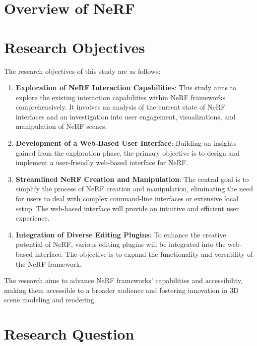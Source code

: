 \section{Overview of NeRF}
\label{sec:intro:nerf}


\section{Research Objectives}
\label{sec:intro:objectives}

The research objectives of this study are as follows:

\begin{enumerate}
    \item \textbf{Exploration of NeRF Interaction Capabilities}: This study aims to explore the existing interaction capabilities within NeRF frameworks comprehensively. It involves an analysis of the current state of NeRF interfaces and an investigation into user engagement, visualizations, and manipulation of NeRF scenes.

    \item \textbf{Development of a Web-Based User Interface}: Building on insights gained from the exploration phase, the primary objective is to design and implement a user-friendly web-based interface for NeRF.

    \item \textbf{Streamlined NeRF Creation and Manipulation}: The central goal is to simplify the process of NeRF creation and manipulation, eliminating the need for users to deal with complex command-line interfaces or extensive local setup. The web-based interface will provide an intuitive and efficient user experience.

    \item \textbf{Integration of Diverse Editing Plugins}: To enhance the creative potential of NeRF, various editing plugins will be integrated into the web-based interface. The objective is to expand the functionality and versatility of the NeRF framework.
\end{enumerate}

The research aims to advance NeRF frameworks' capabilities and accessibility, making them accessible to a broader audience and fostering innovation in 3D scene modeling and rendering.


\section{Research Question}
\label{sec:intro:question}

